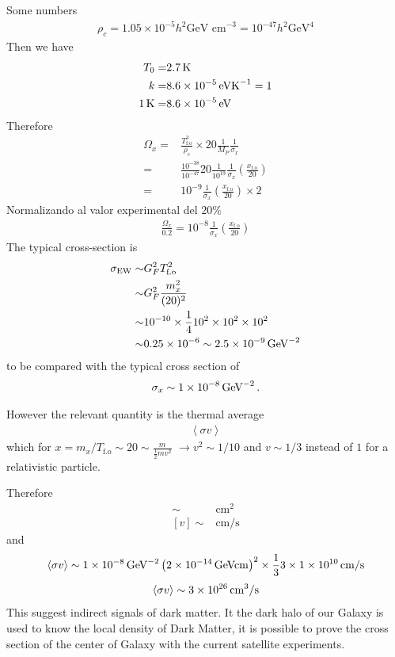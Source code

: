 \documentclass[12pt,letterpaper]{article}
\begin{document}
Some numbers
\begin{align}
  \rho_c=1.05\times10^{-5}h^2 \text{GeV\ cm}^{-3}=10^{-47}h^2\text{GeV}^4
\end{align}
Then we have
\begin{align*}
T_0=&\SI{2.7}{K}\nonumber\\
 k=&\SI{8.6E-5}{eV K}^{-1}=1 \nonumber\\
\SI{1}{K}=&\SI{8.6E-5}{eV}
\end{align*}
Therefore
\begin{align*}
  \Omega_x=&\frac{T_{\text{f.o}}^3}{\rho_c}\times 20 \frac{1}{M_P}\frac{1}{\sigma_x}\nonumber\\
=&\frac{10^{-38}}{10^{-47}}20 \frac{1}{10^{19}}\frac{1}{\sigma_x}\left( \frac{x_{\text{f.o}}}{20} \right)\nonumber\\
=&10^{-9}\frac{1}{\sigma_x}\left( \frac{x_{\text{f.o}}}{20}
\right)\times {2}
\end{align*}
Normalizando al valor experimental del $20\%$
\begin{align*}
  \frac{\Omega_{x}}{0.2}=10^{-8}\frac{1}{\sigma_x}\left( \frac{x_{\text{f.o}}}{20}\right)
\end{align*}
The typical cross-section is
\begin{align*}
  \sigma_{\text{EW}}\sim &G_F^2 T_{\text{f.o}}^2 \nonumber\\
                   \sim &G_F^2 \frac{m_x^2}{(20)^2} \nonumber\\
\sim & 10^{-10}\times \frac{1}{4} 10^2 \times 10^{2}\times 10^{2}\nonumber\\
 \sim& 0.25\times 10^{-6}\sim \SI{2.5E-9}{GeV}^{-2}
\end{align*}
to be compared with the typical cross section of
\begin{align*}
  \sigma_x\sim \SI{1E-8}{GeV}^{-2}\,.
\end{align*}

However the relevant quantity is the thermal average
\begin{align*}
  \left\langle \sigma v \right\rangle
\end{align*}
which for $x=m_x/T_{\text{f.o}}\sim 20\sim \frac{m}{\frac{1}{2}m
  v^2}$ $\to v^2\sim 1/10$ and $v\sim 1/3$ instead of $1$ for a
relativistic particle. 

Therefore
\begin{align*}
  [\sigma]\sim& \text{cm}^{2}\nonumber\\
  [v]\sim&\text{cm/s}
\end{align*}
and
\begin{align*}
   \left\langle \sigma v \right\rangle\sim \SI{1E-8}{GeV}^{-2}\left(
     \SI{2E-14}{GeV cm} \right)^2\times \frac{1}{3}3\times\SI{1E10}{cm/s}
\end{align*}
\begin{align*}
   \left\langle \sigma v \right\rangle\sim \SI{3E26}{cm^3/s}
\end{align*}
This suggest indirect signals of dark matter. It the dark halo of our
Galaxy is used to know the local density of Dark Matter, it is
possible to prove the cross section of the center of Galaxy with the
current satellite experiments.
\end{document}
